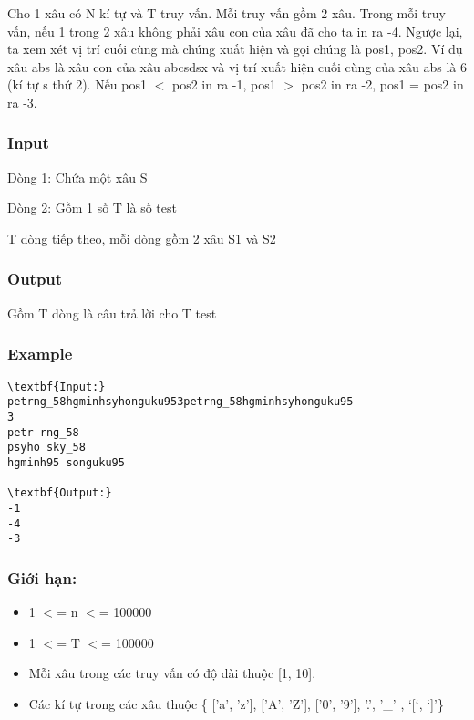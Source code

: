 



     Cho 1 xâu có N kí tự và T truy vấn. Mỗi truy vấn gồm 2 xâu. Trong mỗi truy vấn, nếu 1 trong 2 xâu không phải xâu con của xâu đã cho ta in ra -4. Ngược lại, ta xem xét vị trí cuối cùng mà chúng xuất hiện và gọi chúng là pos1, pos2. Ví dụ xâu abs là xâu con của xâu abcsdsx và vị trí xuất hiện cuối cùng của xâu abs là 6 (kí tự s thứ 2). Nếu pos1 $<$ pos2 in ra -1, pos1 $>$ pos2 in ra -2, pos1 = pos2 in ra -3.    

\subsubsection{   Input  }

   Dòng 1: Chứa một xâu S  

   Dòng 2: Gồm 1 số T là số test  

   T dòng tiếp theo, mỗi dòng gồm 2 xâu S1 và S2  

\subsubsection{   Output  }

   Gồm T dòng là câu trả lời cho T test  

\subsubsection{   Example  }
\begin{verbatim}
\textbf{Input:}
petrng_58hgminhsyhonguku953petrng_58hgminhsyhonguku95
3
petr rng_58
psyho sky_58
hgminh95 songuku95

\textbf{Output:}
-1
-4
-3

\end{verbatim}

\subsubsection{   Giới hạn:  }
\begin{itemize}
	\item        1 $<$= n $<$= 100000      
	\item          1 $<$= T $<$= 100000        
	\item            Mỗi xâu trong các truy vấn có độ dài thuộc [1, 10].          
	\item              Các kí tự trong các xâu thuộc \{ ['a', 'z'], ['A', 'Z'], ['0', '9'], '.', '\_' , ‘[‘, ‘]’\}            
\end{itemize}